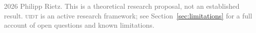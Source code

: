 \begin{titlepage}
\begin{center}
\vfill

{\scriptsize\textcolor{dimgray}{%
  \textcopyright{} 2026 Philipp Rietz.
  This is a theoretical research proposal, not an established result.
  \textsc{uidt} is an active research framework; see
  Section~\ref{sec:limitations} for a full account of open questions
  and known limitations.
}}

\end{center}
\end{titlepage}
\cleardoublepage
\pagestyle{uidtsecure}
\setcounter{page}{1}
